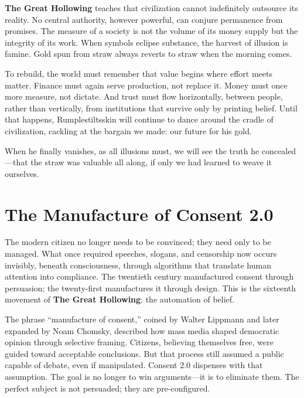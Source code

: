 \documentclass[11pt,twoside]{book}
\begin{document}
\textbf{The Great Hollowing} teaches that civilization cannot indefinitely outsource its reality.  
No central authority, however powerful, can conjure permanence from promises.  
The measure of a society is not the volume of its money supply but the integrity of its work.  
When symbols eclipse substance, the harvest of illusion is famine.  
Gold spun from straw always reverts to straw when the morning comes.

To rebuild, the world must remember that value begins where effort meets matter.  
Finance must again serve production, not replace it.  
Money must once more measure, not dictate.  
And trust must flow horizontally, between people, rather than vertically, from institutions that survive only by printing belief.  
Until that happens, Rumplestiltsskin will continue to dance around the cradle of civilization, cackling at the bargain we made: our future for his gold.

When he finally vanishes, as all illusions must, we will see the truth he concealed—that the straw was valuable all along, if only we had learned to weave it ourselves.

\chapter{The Manufacture of Consent 2.0}
\label{ch:18}

The modern citizen no longer needs to be convinced; they need only to be managed.  
What once required speeches, slogans, and censorship now occurs invisibly, beneath consciousness, through algorithms that translate human attention into compliance.  The twentieth century manufactured consent through persuasion; the twenty-first manufactures it through design.  This is the sixteenth movement of \textbf{The Great Hollowing}: the automation of belief.

The phrase “manufacture of consent,” coined by Walter Lippmann and later expanded by Noam Chomsky, described how mass media shaped democratic opinion through selective framing.  Citizens, believing themselves free, were guided toward acceptable conclusions.  But that process still assumed a public capable of debate, even if manipulated.  Consent 2.0 dispenses with that assumption.  The goal is no longer to win arguments—it is to eliminate them.  The perfect subject is not persuaded; they are pre-configured.
\end{document}
